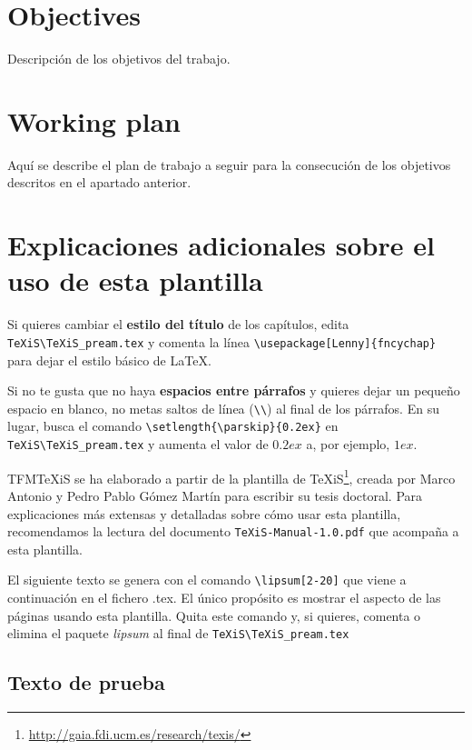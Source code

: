 \section{Objectives}
Descripción de los objetivos del trabajo.


\section{Working plan}
Aquí se describe el plan de trabajo a seguir para la consecución de los objetivos descritos en el apartado anterior.



\section{Explicaciones adicionales sobre el uso de esta plantilla}
Si quieres cambiar el \textbf{estilo del título} de los capítulos, edita \verb|TeXiS\TeXiS_pream.tex| y comenta la línea \verb|\usepackage[Lenny]{fncychap}| para dejar el estilo básico de \LaTeX.

Si no te gusta que no haya \textbf{espacios entre párrafos} y quieres dejar un pequeño espacio en blanco, no metas saltos de línea (\verb|\\|) al final de los párrafos. En su lugar, busca el comando  \verb|\setlength{\parskip}{0.2ex}| en \verb|TeXiS\TeXiS_pream.tex| y aumenta el valor de $0.2ex$ a, por ejemplo, $1ex$.

TFMTeXiS se ha elaborado a partir de la plantilla de TeXiS\footnote{\url{http://gaia.fdi.ucm.es/research/texis/}}, creada por Marco Antonio y Pedro Pablo Gómez Martín para escribir su tesis doctoral. Para explicaciones más extensas y detalladas sobre cómo usar esta plantilla, recomendamos la lectura del documento \texttt{TeXiS-Manual-1.0.pdf} que acompaña a esta plantilla.

El siguiente texto se genera con el comando \verb|\lipsum[2-20]| que viene a continuación en el fichero .tex. El único propósito es mostrar el aspecto de las páginas usando esta plantilla. Quita este comando y, si quieres, comenta o elimina el paquete \textit{lipsum} al final de \verb|TeXiS\TeXiS_pream.tex|

\subsection{Texto de prueba}


\lipsum[2-20]
